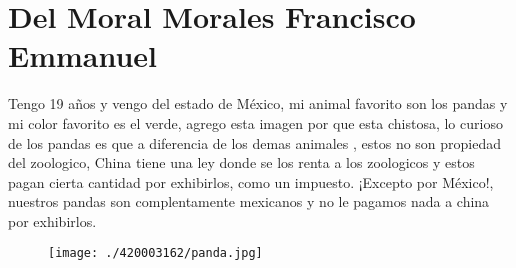 \chapter{Del Moral Morales Francisco Emmanuel}
Tengo 19 años y vengo del estado de México, mi animal favorito son los pandas y mi color favorito es el verde, agrego esta imagen por que esta chistosa, lo curioso de los pandas es que a diferencia de los demas animales , estos no son propiedad del zoologico, China tiene una ley donde se los renta a los zoologicos y estos pagan cierta cantidad por exhibirlos, como un impuesto. ¡Excepto por México!, nuestros pandas son complentamente mexicanos y no le pagamos nada a china por exhibirlos.
\begin{figure}[h] %
  \begin{center}                                                                
    \texttt{[image: ./420003162/panda.jpg]}                                                                             
  \end{center}                                                                  
\end{figure}  

